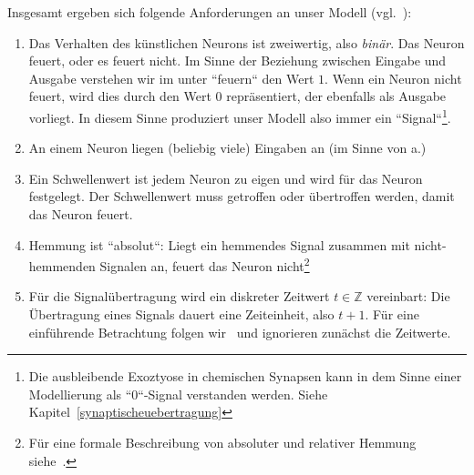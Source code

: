 Insgesamt ergeben sich folgende Anforderungen an unser Modell (vgl.~\cite[26 f.]{Fau94}):

\begin{enumerate}
    \item Das Verhalten des künstlichen Neurons ist zweiwertig, also \textit{binär}. Das Neuron feuert, oder es feuert nicht. Im Sinne der Beziehung zwischen Eingabe und Ausgabe verstehen wir im unter ``feuern`` den Wert $1$. Wenn ein Neuron nicht feuert, wird dies durch den Wert $0$ repräsentiert, der ebenfalls als Ausgabe vorliegt. In diesem Sinne produziert unser Modell also immer ein ``Signal``\footnote{
        Die ausbleibende Exoztyose in chemischen Synapsen kann in dem Sinne einer Modellierung als ``0``-Signal verstanden werden. Siehe Kapitel~\ref{synaptischeuebertragung}
    }.
    \item An einem Neuron liegen (beliebig viele) Eingaben an (im Sinne von a.)
    \item Ein Schwellenwert ist jedem Neuron zu eigen und wird für das Neuron festgelegt. Der Schwellenwert muss getroffen oder übertroffen werden, damit das Neuron feuert.
    \item Hemmung ist ``absolut``: Liegt ein hemmendes Signal zusammen mit nicht-hemmenden Signalen an, feuert das Neuron nicht\footnote{
        Für eine formale Beschreibung von absoluter und relativer Hemmung siehe~\cite[42 f.]{Roj93}.
    }
    \item Für die Signalübertragung wird ein diskreter Zeitwert $t \in \mathbb{Z}$ vereinbart: Die Übertragung eines Signals dauert eine Zeiteinheit, also $t + 1$. Für eine einführende Betrachtung folgen wir~\cite[33 f.]{Roj93} und ignorieren zunächst die Zeitwerte.
\end{enumerate}


